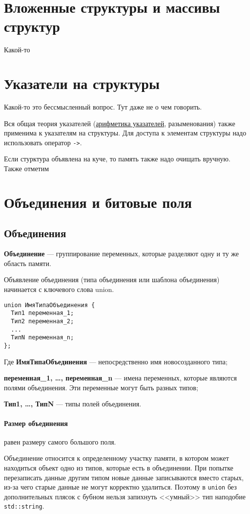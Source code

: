 \documentclass[14pt, a4paper]{extarticle}
\begin{document}
\section{Вложенные структуры и массивы структур}
Какой-то 

\section{Указатели на структуры}
Какой-то это бессмысленный вопрос. Тут даже не о чем говорить.

Вся общая теория указателей (\hyperref[sec:ptr_arithm]{арифметика указателей}, разыменования) также
применима к указателям на структуры. Для доступа к элементам структуры надо использовать
оператор \verb|->|.

Если стурктура объявлена на куче, то память также надо очищать вручную.
Также отметим

\section{Объединения и битовые поля}
\subsection*{Объединения}
\textbf{Объединение} --- группирование переменных, которые разделяют одну и ту же область памяти.

Объявление объединения (типа объединения или шаблона объединения) начинается с ключевого слова union.

\begin{verbatim}
union ИмяТипаОбъединения {
  Тип1 переменная_1;
  Тип2 переменная_2;
  ...
  ТипN переменная_n;
};
\end{verbatim}

Где
\textbf{ИмяТипаОбъединения} --- непосредственно имя новосозданного типа;

\textbf{переменная\_1, \dots, переменная\_n} --- имена переменных, которые являются полями объединения.
Эти переменные могут быть разных типов;

\textbf{Тип1, \dots, ТипN} --- типы полей объединения.

\paragraph{Размер объединения} равен размеру самого большого поля.

Объединение относится к определенному участку памяти, в котором может находиться объект одно из типов,
которые есть в объединении. При попытке перезаписать данные другим типом новые данные записываются
вместо старых, из-за чего старые данные не могут корректно удалиться. Поэтому в \verb|union| без
дополнительных плясок с бубном нельзя запихнуть <<умный>> тип наподобие \verb|std::string|.
\end{document}
